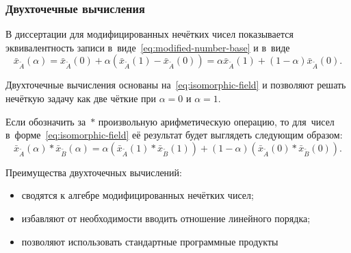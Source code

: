 \documentclass[12pt]{beamer}
\begin{document}
\begin{frame}
  \frametitle{Двухточечные вычисления}
  В диссертации для модифицированных нечётких чисел показывается эквивалентность записи в~виде~\eqref{eq:modified-number-base} и в~виде
\begin{equation}
\label{eq:isomorphic-field}
  \bar{x}_{\tilde A}\left( \alpha \right)=\bar{x}_{\tilde A}\left( 0 \right)+\alpha \left(\bar{x}_{\tilde A}\left( 1 \right)-\bar{x}_{\tilde A}\left(0 \right) \right)=\alpha \bar{x}_{\tilde A}\left( 1 \right)+\left( 1-\alpha  \right) \bar{x}_{\tilde A}\left( 0 \right).
\end{equation}

Двухточечные вычисления основаны на~\eqref{eq:isomorphic-field} и позволяют решать нечёткую задачу как две чёткие при $\alpha=0$ и $\alpha=1$. 

Если обозначить за~$*$ произвольную арифметическую операцию, то для~чисел в~форме~\eqref{eq:isomorphic-field} её результат будет выглядеть следующим образом:
\begin{equation}
\label{eq:two-point-calculations}
  \bar{x}_{\tilde A}\left( \alpha \right)*\bar{x}_{\tilde B}\left(\alpha \right)=\alpha \left(\bar{x}_{\tilde A}\left( 1 \right)*\bar{x}_{\tilde B}\left(1 \right) \right)+\left(1-\alpha \right)\left(\bar{x}_{\tilde A}\left(0 \right)*\bar{x}_{\tilde B}\left(0 \right) \right).
\end{equation}

Преимущества двухточечных вычислений:
\begin{itemize}
  \item сводятся к алгебре модифицированных нечётких чисел;
  \item избавляют от необходимости вводить отношение линейного порядка;
  \item позволяют использовать стандартные программные продукты
\end{itemize}


\end{frame}
\end{document}
